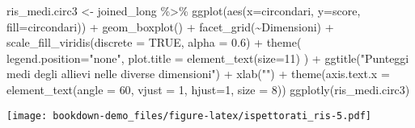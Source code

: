 \documentclass[
]{book}
\newenvironment{Shaded}{\begin{snugshade}}{\end{snugshade}}
\newcommand{\AttributeTok}[1]{\textcolor[rgb]{0.77,0.63,0.00}{#1}}
\newcommand{\ConstantTok}[1]{\textcolor[rgb]{0.00,0.00,0.00}{#1}}
\newcommand{\DecValTok}[1]{\textcolor[rgb]{0.00,0.00,0.81}{#1}}
\newcommand{\FloatTok}[1]{\textcolor[rgb]{0.00,0.00,0.81}{#1}}
\newcommand{\FunctionTok}[1]{\textcolor[rgb]{0.00,0.00,0.00}{#1}}
\newcommand{\NormalTok}[1]{#1}
\newcommand{\OtherTok}[1]{\textcolor[rgb]{0.56,0.35,0.01}{#1}}
\newcommand{\SpecialCharTok}[1]{\textcolor[rgb]{0.00,0.00,0.00}{#1}}
\newcommand{\StringTok}[1]{\textcolor[rgb]{0.31,0.60,0.02}{#1}}
\begin{document}
\begin{Shaded}
\begin{Highlighting}[]
\NormalTok{ris\_medi.circ3 }\OtherTok{\textless{}{-}}\NormalTok{ joined\_long }\SpecialCharTok{\%\textgreater{}\%}
  \FunctionTok{ggplot}\NormalTok{(}\FunctionTok{aes}\NormalTok{(}\AttributeTok{x=}\NormalTok{circondari, }\AttributeTok{y=}\NormalTok{score, }\AttributeTok{fill=}\NormalTok{circondari)) }\SpecialCharTok{+}
  \FunctionTok{geom\_boxplot}\NormalTok{() }\SpecialCharTok{+}
  \FunctionTok{facet\_grid}\NormalTok{(}\SpecialCharTok{\textasciitilde{}}\NormalTok{Dimensioni) }\SpecialCharTok{+}
  \FunctionTok{scale\_fill\_viridis}\NormalTok{(}\AttributeTok{discrete =} \ConstantTok{TRUE}\NormalTok{, }\AttributeTok{alpha =} \FloatTok{0.6}\NormalTok{) }\SpecialCharTok{+}
  \FunctionTok{theme}\NormalTok{(}
    \AttributeTok{legend.position=}\StringTok{"none"}\NormalTok{,}
    \AttributeTok{plot.title =} \FunctionTok{element\_text}\NormalTok{(}\AttributeTok{size=}\DecValTok{11}\NormalTok{)}
\NormalTok{  ) }\SpecialCharTok{+}
  \FunctionTok{ggtitle}\NormalTok{(}\StringTok{"Punteggi medi degli allievi nelle diverse dimensioni"}\NormalTok{) }\SpecialCharTok{+}
  \FunctionTok{xlab}\NormalTok{(}\StringTok{""}\NormalTok{) }\SpecialCharTok{+}
  \FunctionTok{theme}\NormalTok{(}\AttributeTok{axis.text.x =} \FunctionTok{element\_text}\NormalTok{(}\AttributeTok{angle =} \DecValTok{60}\NormalTok{, }\AttributeTok{vjust =} \DecValTok{1}\NormalTok{, }\AttributeTok{hjust=}\DecValTok{1}\NormalTok{, }\AttributeTok{size =} \DecValTok{8}\NormalTok{))}
\FunctionTok{ggplotly}\NormalTok{(ris\_medi.circ3)}
\end{Highlighting}
\end{Shaded}

\texttt{[image: bookdown-demo\_files/figure-latex/ispettorati\_ris-5.pdf]}

\begin{Shaded}
\end{Shaded}
\end{document}
